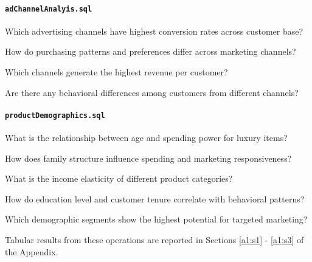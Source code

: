 \documentclass[12pt,a4paper]{article}
\newcommand{\textittt}[1]{\texttt{#1}}
\begin{document}
\paragraph{\textittt{adChannelAnalyis.sql}}
\begin{itemize}
\begin{minipage}{\textwidth}
    \item Which advertising channels have highest conversion rates across customer base?
    \item How do purchasing patterns and preferences differ across marketing channels?
    \item Which channels generate the highest revenue per customer?
    \item Are there any behavioral differences among customers from different channels?
\end{minipage}
\end{itemize}

\paragraph{\textittt{productDemographics.sql}}
\begin{itemize}
\begin{minipage}{\textwidth}
    \item What is the relationship between age and spending power for luxury items?
    \item How does family structure influence spending and marketing responsiveness?
    \item What is the income elasticity of different product categories?
    \item How do education level and customer tenure correlate with behavioral patterns?
    \item Which demographic segments show the highest potential for targeted marketing?
\end{minipage}
\end{itemize}    

\noindent Tabular results from these operations are reported in Sections \ref{a1:s1} - \ref{a1:s3} of the Appendix.
\end{document}
